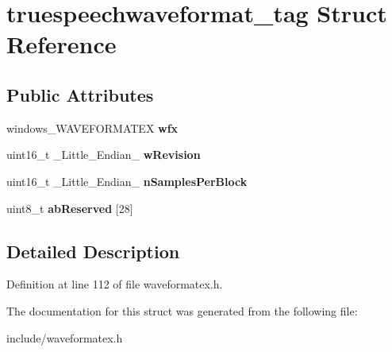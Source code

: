 \hypertarget{structtruespeechwaveformat__tag}{\section{truespeechwaveformat\-\_\-tag Struct Reference}
\label{structtruespeechwaveformat__tag}
}
\subsection*{Public Attributes}
\begin{DoxyCompactItemize}
\item 
\hypertarget{structtruespeechwaveformat__tag_a613dbff8211b0c80ea6ba16bc5930d5c}{windows\-\_\-\-W\-A\-V\-E\-F\-O\-R\-M\-A\-T\-E\-X {\bfseries wfx}}\label{structtruespeechwaveformat__tag_a613dbff8211b0c80ea6ba16bc5930d5c}

\item 
\hypertarget{structtruespeechwaveformat__tag_a9ce078aa12eb0d2df35b17963bd795e1}{uint16\-\_\-t \-\_\-\-Little\-\_\-\-Endian\-\_\- {\bfseries w\-Revision}}\label{structtruespeechwaveformat__tag_a9ce078aa12eb0d2df35b17963bd795e1}

\item 
\hypertarget{structtruespeechwaveformat__tag_af9639422309357777e4340ee84eecd46}{uint16\-\_\-t \-\_\-\-Little\-\_\-\-Endian\-\_\- {\bfseries n\-Samples\-Per\-Block}}\label{structtruespeechwaveformat__tag_af9639422309357777e4340ee84eecd46}

\item 
\hypertarget{structtruespeechwaveformat__tag_a580ca392bf525c46cff6c094ec8f9671}{uint8\-\_\-t {\bfseries ab\-Reserved} \mbox{[}28\mbox{]}}\label{structtruespeechwaveformat__tag_a580ca392bf525c46cff6c094ec8f9671}

\end{DoxyCompactItemize}


\subsection{Detailed Description}


Definition at line 112 of file waveformatex.\-h.



The documentation for this struct was generated from the following file\-:\begin{DoxyCompactItemize}
\item 
include/waveformatex.\-h\end{DoxyCompactItemize}
